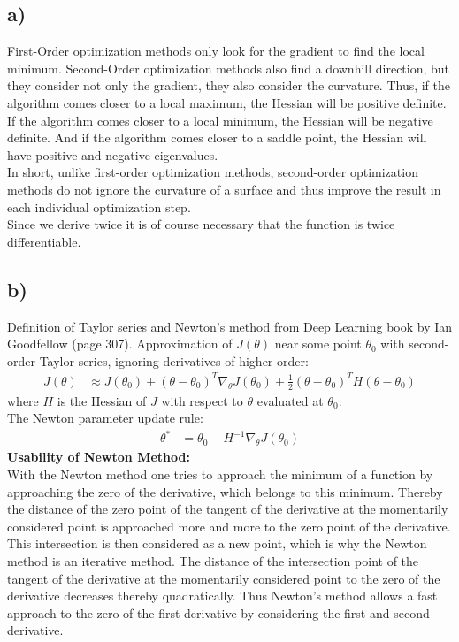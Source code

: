\documentclass[a4paper]{article}
\begin{document}
    \subsection*{a)}
        First-Order optimization methods only look for the gradient to find the local minimum.
        Second-Order optimization methods also find a downhill direction, but they consider not only the gradient, they also consider the curvature.
        Thus, if the algorithm comes closer to a local maximum, the Hessian will be positive definite.
        If the algorithm comes closer to a local minimum, the Hessian will be negative definite.
        And if the algorithm comes closer to a saddle point, the Hessian will have positive and negative eigenvalues.\\
        In short, unlike first-order optimization methods, second-order optimization methods do not ignore the curvature of a surface and thus improve the result in each individual optimization step.\\
        
        Since we derive twice it is of course necessary that the function is twice differentiable.
        

    \subsection*{b)}
        Definition of Taylor series and Newton's method from Deep Learning book by Ian Goodfellow (page 307).
        Approximation of $J(\theta)$ near some point $\theta_0$ with second-order Taylor series, ignoring derivatives of higher order:
        \begin{align}
            J(\theta) &\approx J(\theta_0) + (\theta - \theta_0)^T \nabla_{\theta} J(\theta_0) + \frac{1}{2} (\theta - \theta_0)^T H(\theta - \theta_0)
        \end{align}
        where $H$ is the Hessian of $J$ with respect to $\theta$ evaluated at $\theta_0$.\\
        The Newton parameter update rule:
        \begin{align}
            \theta^* &= \theta_0 - H^{-1} \nabla_{\theta} J(\theta_0)
        \end{align}
        \textbf{Usability of Newton Method:}\\
        With the Newton method one tries to approach the minimum of a function by approaching the zero of the derivative, which belongs to this minimum.
        Thereby the distance of the zero point of the tangent of the derivative at the momentarily considered point is approached more and more to the zero point of the derivative.
        This intersection is then considered as a new point, which is why the Newton method is an iterative method.
        The distance of the intersection point of the tangent of the derivative at the momentarily considered point to the zero of the derivative decreases thereby quadratically.
        Thus Newton's method allows a fast approach to the zero of the first derivative by considering the first and second derivative.
\end{document}
